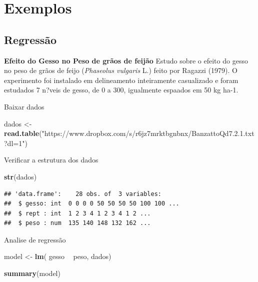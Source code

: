 \documentclass[]{book}
\newenvironment{Shaded}{\begin{snugshade}}{\end{snugshade}}
\newcommand{\KeywordTok}[1]{\textcolor[rgb]{0.13,0.29,0.53}{\textbf{#1}}}
\newcommand{\NormalTok}[1]{#1}
\newcommand{\OperatorTok}[1]{\textcolor[rgb]{0.81,0.36,0.00}{\textbf{#1}}}
\newcommand{\StringTok}[1]{\textcolor[rgb]{0.31,0.60,0.02}{#1}}
\begin{document}
\hypertarget{exemplos}{%
\section{Exemplos}\label{exemplos}}

\hypertarget{regressao}{%
\subsection{Regressão}\label{regressao}}

\textbf{Efeito do Gesso no Peso de grãos de feijão}
Estudo sobre o efeito do gesso no peso de grãos de feijo (\emph{Phaseolus vulgaris} L.) feito por Ragazzi (1979). O experimento foi instalado em delineamento inteiramente casualizado e foram estudados 7 n?veis de gesso, de 0 a 300, igualmente espaados em 50 kg ha-1.

Baixar dados

\begin{Shaded}
\begin{Highlighting}[]
\NormalTok{dados <-}\StringTok{ }\KeywordTok{read.table}\NormalTok{(}\StringTok{"https://www.dropbox.com/s/r6jz7mrktbgnbnx/BanzattoQd7.2.1.txt?dl=1"}\NormalTok{)}
\end{Highlighting}
\end{Shaded}

Verificar a estrutura dos dados

\begin{Shaded}
\begin{Highlighting}[]
\KeywordTok{str}\NormalTok{(dados)}
\end{Highlighting}
\end{Shaded}

\begin{verbatim}
## 'data.frame':    28 obs. of  3 variables:
##  $ gesso: int  0 0 0 0 50 50 50 50 100 100 ...
##  $ rept : int  1 2 3 4 1 2 3 4 1 2 ...
##  $ peso : num  135 140 148 132 162 ...
\end{verbatim}

Analise de regressão

\begin{Shaded}
\begin{Highlighting}[]
\NormalTok{model <-}\StringTok{ }\KeywordTok{lm}\NormalTok{(  gesso }\OperatorTok{~}\StringTok{ }\NormalTok{peso, dados)}

\KeywordTok{summary}\NormalTok{(model)}
\end{Highlighting}
\end{Shaded}
\end{document}
